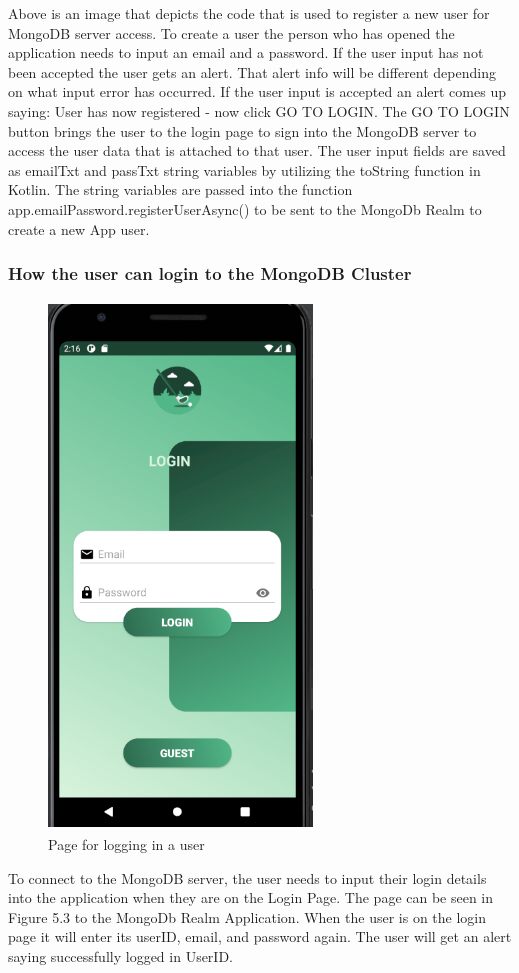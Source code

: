 Above is an image that depicts the code that is used to register a new user for MongoDB server access. To create a user the person who has opened the application needs to input an email and a password. If the user input has not been accepted the user gets an alert. That alert info will be different depending on what input error has occurred. If the user input is accepted an alert comes up saying: User has now registered - now click GO TO LOGIN. The GO TO LOGIN button brings the user to the login page to sign into the MongoDB server to access the user data that is attached to that user. 
\newline
The user input fields are saved as emailTxt and passTxt string variables by utilizing the toString function in Kotlin. The string variables are passed into the function app.emailPassword.registerUserAsync() to be sent to the MongoDb Realm to create a new App user.
\subsubsection{How the user can login to the MongoDB Cluster}
\begin{figure}[H]
    \centering
    \includegraphics[width=7cm, height = 14cm]{img/loginPage.PNG}
    \caption{Page for logging in a user}
    \label{fig:altas config}
\end{figure}
To connect to the MongoDB server, the user needs to input their login details into the application when they are on the Login Page. The page can be seen in Figure 5.3 to the MongoDb Realm Application. When the user is on the login page it will enter its userID, email, and password again. The user will get an alert saying successfully logged in UserID.

